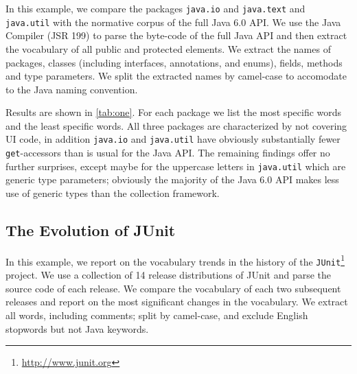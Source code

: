 \documentclass[10pt]{book}
\begin{document}
In this example, we compare the packages \verb$java.io$ and \verb$java.text$ and \verb$java.util$ with the normative corpus of the full Java 6.0 API. We use the Java Compiler (JSR 199) to parse the byte-code of the full Java API and then extract the vocabulary of all public and protected elements. We extract the names of packages, classes (including interfaces, annotations, and enums), fields, methods and type parameters. We split the extracted names by camel-case to accomodate to the Java naming convention.

Results are shown in \autoref{tab:one}. For each package we list the most specific words and the least specific words. All three packages are characterized by not covering UI code, in addition \verb$java.io$ and \verb$java.util$ have obviously substantially fewer \verb$get$-accessors than is usual for the Java API. The remaining findings offer no further surprises, except maybe for the uppercase letters in \verb$java.util$ which are generic type parameters; obviously the majority of the Java 6.0 API makes less use of generic types than the collection framework.



\subsection{The Evolution of JUnit}\label{example3}

In this example, we report on the vocabulary trends in the history of the \verb$JUnit$\footnote{\url{http://www.junit.org}} project. We use a collection of 14 release distributions of JUnit and parse the source code of each release.  We compare the vocabulary of each two subsequent releases and report on the most significant changes in the vocabulary. We extract all words, including comments; split by camel-case, and exclude English stopwords but not Java keywords.
\end{document}

